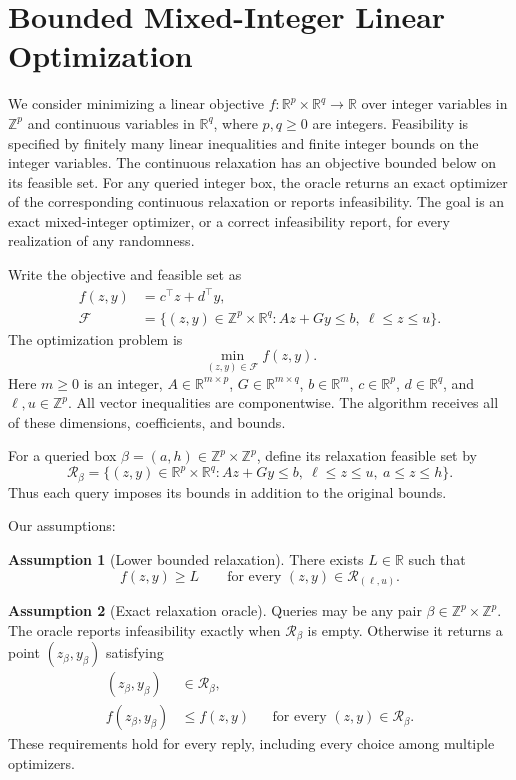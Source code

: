 \documentclass[10pt]{article}
\theoremstyle{definition}
\newtheorem{assumption}{Assumption}
\begin{document}
\section*{Bounded Mixed-Integer Linear Optimization}
We consider minimizing a linear objective $f:\mathbb{R}^p\times\mathbb{R}^q\to\mathbb{R}$ over integer variables in $\mathbb{Z}^p$ and continuous variables in $\mathbb{R}^q$, where $p,q\geq0$ are integers. Feasibility is specified by finitely many linear inequalities and finite integer bounds on the integer variables. The continuous relaxation has an objective bounded below on its feasible set. For any queried integer box, the oracle returns an exact optimizer of the corresponding continuous relaxation or reports infeasibility. The goal is an exact mixed-integer optimizer, or a correct infeasibility report, for every realization of any randomness.

Write the objective and feasible set as
\[
\begin{aligned}
f(z,y)&=c^\top z+d^\top y,\\
\mathcal{F}&=\{(z,y)\in\mathbb{Z}^p\times\mathbb{R}^q:
Az+Gy\leq b,\ \ell\leq z\leq u\}.
\end{aligned}
\]
The optimization problem is
\[
\min_{(z,y)\in\mathcal{F}} f(z,y).
\]
Here $m\geq0$ is an integer, $A\in\mathbb{R}^{m\times p}$, $G\in\mathbb{R}^{m\times q}$, $b\in\mathbb{R}^m$, $c\in\mathbb{R}^p$, $d\in\mathbb{R}^q$, and $\ell,u\in\mathbb{Z}^p$. All vector inequalities are componentwise. The algorithm receives all of these dimensions, coefficients, and bounds.

For a queried box $\beta=(a,h)\in\mathbb{Z}^p\times\mathbb{Z}^p$, define its relaxation feasible set by
\[
\mathcal{R}_{\beta}
=\{(z,y)\in\mathbb{R}^p\times\mathbb{R}^q:
Az+Gy\leq b,\ \ell\leq z\leq u,\ a\leq z\leq h\}.
\]
Thus each query imposes its bounds in addition to the original bounds.

Our assumptions:
\begin{assumption}[Lower bounded relaxation]
There exists $L\in\mathbb{R}$ such that
\[
f(z,y)\geq L
\qquad\text{for every }(z,y)\in\mathcal{R}_{(\ell,u)}.
\]
\end{assumption}

\begin{assumption}[Exact relaxation oracle]
Queries may be any pair $\beta\in\mathbb{Z}^p\times\mathbb{Z}^p$. The oracle reports infeasibility exactly when $\mathcal{R}_{\beta}$ is empty. Otherwise it returns a point $(z_{\beta},y_{\beta})$ satisfying
\[
\begin{aligned}
(z_{\beta},y_{\beta})&\in\mathcal{R}_{\beta},\\
f(z_{\beta},y_{\beta})&\leq f(z,y)
&&\text{for every }(z,y)\in\mathcal{R}_{\beta}.
\end{aligned}
\]
These requirements hold for every reply, including every choice among multiple optimizers.
\end{assumption}
\end{document}
